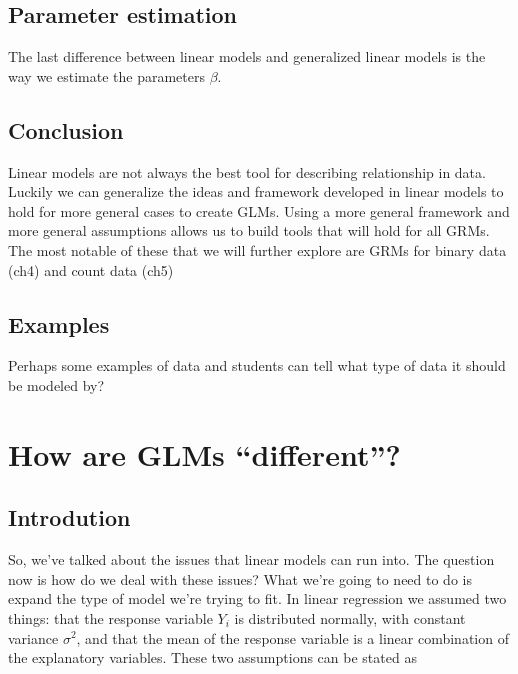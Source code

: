 \documentclass[
]{book}
\begin{document}
\hypertarget{parameter-estimation}{%
\section{Parameter estimation}\label{parameter-estimation}}

The last difference between linear models and generalized linear models is the way we estimate the parameters \(\beta\).

\hypertarget{conclusion}{%
\section{Conclusion}\label{conclusion}}

Linear models are not always the best tool for describing relationship in data. Luckily we can generalize the ideas and framework developed in linear models to hold for more general cases to create GLMs. Using a more general framework and more general assumptions allows us to build tools that will hold for all GRMs. The most notable of these that we will further explore are GRMs for binary data (ch4) and count data (ch5)

\hypertarget{examples}{%
\section{Examples}\label{examples}}

Perhaps some examples of data and students can tell what type of data it should be modeled by?

\hypertarget{how-are-glms-different}{%
\chapter{How are GLMs ``different''?}\label{how-are-glms-different}}

\hypertarget{introdution}{%
\section{Introdution}\label{introdution}}

So, we've talked about the issues that linear models can run into. The question now is how do we deal with these issues? What we're going to need to do is expand the type of model we're trying to fit. In linear regression we assumed two things: that the response variable \(Y_i\) is distributed normally, with constant variance \(\sigma^2\), and that the mean of the response variable is a linear combination of the explanatory variables. These two assumptions can be stated as
\end{document}
